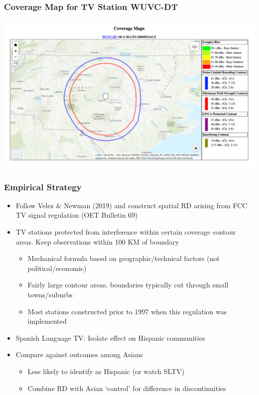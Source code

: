\documentclass{beamer}
\begin{document}
\begin{frame}
\frametitle{Coverage Map for TV Station WUVC-DT}
\centering
        \includegraphics[width=1\textwidth]{../../analysis/Output/img/ContourExample.png}\\
\end{frame}

\begin{frame}
\frametitle{Empirical Strategy}


\begin{itemize}
\item Follow Velez \& Newman (2019) and construct spatial RD arising from FCC TV signal regulation (OET Bulletin 69)
\item TV stations protected from interference within certain coverage contour areas. Keep observations within 100 KM of boundary
\begin{itemize}
\item Mechanical formula based on geographic/technical factors (not political/economic)
\item Fairly large contour areas, boundaries typically cut through small towns/suburbs
\item Most stations constructed prior to 1997 when this regulation was implemented
\end{itemize}
\item Spanish Language TV: Isolate effect on Hispanic communities

\pause
\item Compare against outcomes among Asians
\begin{itemize}
\item Less likely to identify as Hispanic (or watch SLTV)
\item Combine RD with Asian `control' for difference in discontinuities
\end{itemize}

\end{itemize}

\end{frame}
\end{document}
